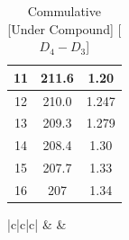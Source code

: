 \documentclass[a4paper,12pt]{article}
\begin{document}
\begin{table}[H]
\begin{subtable}[t]{0.45\textwidth}
\begin{tabular}{|c|c|c|}
			11                                                                              & 211.6                                                                                          & 1.20                                                                                       \\ \hline
			12                                                                              & 210.0                                                                                          & 1.247                                                                                      \\ \hline
			13                                                                              & 209.3                                                                                          & 1.279                                                                                      \\ \hline
			14                                                                              & 208.4                                                                                          & 1.30                                                                                        \\ \hline
			15                                                                              & 207.7                                                                                          & 1.33                                                                                       \\ \hline
			16                                                                              & 207                                                                                            & 1.34                                                                                       \\ \hline
		\end{tabular}
			\caption{Commulative [Under Compound] [$D_4-D_3$] } %
		\end{subtable}
		\hfil
		\begin{subtable}[t]{0.32\textwidth} %
			\centering
			\begin{tabular}{|c|c|c|}
			\hline
			 &  &  \\ \hline

\end{tabular}
\end{subtable}
\end{table}
\end{document}
